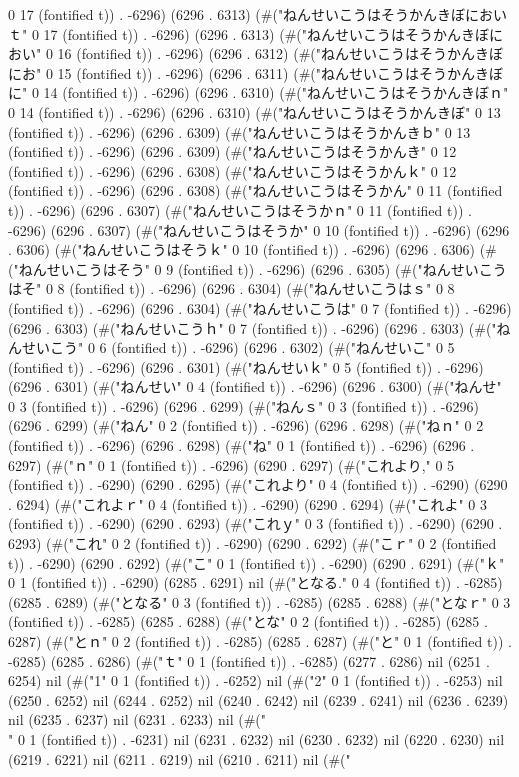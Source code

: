 0 17 (fontified t)) . -6296) (6296 . 6313) (#("ねんせいこうはそうかんきぼにおいｔ" 0 17 (fontified t)) . -6296) (6296 . 6313) (#("ねんせいこうはそうかんきぼにおい" 0 16 (fontified t)) . -6296) (6296 . 6312) (#("ねんせいこうはそうかんきぼにお" 0 15 (fontified t)) . -6296) (6296 . 6311) (#("ねんせいこうはそうかんきぼに" 0 14 (fontified t)) . -6296) (6296 . 6310) (#("ねんせいこうはそうかんきぼｎ" 0 14 (fontified t)) . -6296) (6296 . 6310) (#("ねんせいこうはそうかんきぼ" 0 13 (fontified t)) . -6296) (6296 . 6309) (#("ねんせいこうはそうかんきｂ" 0 13 (fontified t)) . -6296) (6296 . 6309) (#("ねんせいこうはそうかんき" 0 12 (fontified t)) . -6296) (6296 . 6308) (#("ねんせいこうはそうかんｋ" 0 12 (fontified t)) . -6296) (6296 . 6308) (#("ねんせいこうはそうかん" 0 11 (fontified t)) . -6296) (6296 . 6307) (#("ねんせいこうはそうかｎ" 0 11 (fontified t)) . -6296) (6296 . 6307) (#("ねんせいこうはそうか" 0 10 (fontified t)) . -6296) (6296 . 6306) (#("ねんせいこうはそうｋ" 0 10 (fontified t)) . -6296) (6296 . 6306) (#("ねんせいこうはそう" 0 9 (fontified t)) . -6296) (6296 . 6305) (#("ねんせいこうはそ" 0 8 (fontified t)) . -6296) (6296 . 6304) (#("ねんせいこうはｓ" 0 8 (fontified t)) . -6296) (6296 . 6304) (#("ねんせいこうは" 0 7 (fontified t)) . -6296) (6296 . 6303) (#("ねんせいこうｈ" 0 7 (fontified t)) . -6296) (6296 . 6303) (#("ねんせいこう" 0 6 (fontified t)) . -6296) (6296 . 6302) (#("ねんせいこ" 0 5 (fontified t)) . -6296) (6296 . 6301) (#("ねんせいｋ" 0 5 (fontified t)) . -6296) (6296 . 6301) (#("ねんせい" 0 4 (fontified t)) . -6296) (6296 . 6300) (#("ねんせ" 0 3 (fontified t)) . -6296) (6296 . 6299) (#("ねんｓ" 0 3 (fontified t)) . -6296) (6296 . 6299) (#("ねん" 0 2 (fontified t)) . -6296) (6296 . 6298) (#("ねｎ" 0 2 (fontified t)) . -6296) (6296 . 6298) (#("ね" 0 1 (fontified t)) . -6296) (6296 . 6297) (#("ｎ" 0 1 (fontified t)) . -6296) (6290 . 6297) (#("これより," 0 5 (fontified t)) . -6290) (6290 . 6295) (#("これより" 0 4 (fontified t)) . -6290) (6290 . 6294) (#("これよｒ" 0 4 (fontified t)) . -6290) (6290 . 6294) (#("これよ" 0 3 (fontified t)) . -6290) (6290 . 6293) (#("これｙ" 0 3 (fontified t)) . -6290) (6290 . 6293) (#("これ" 0 2 (fontified t)) . -6290) (6290 . 6292) (#("こｒ" 0 2 (fontified t)) . -6290) (6290 . 6292) (#("こ" 0 1 (fontified t)) . -6290) (6290 . 6291) (#("ｋ" 0 1 (fontified t)) . -6290) (6285 . 6291) nil (#("となる." 0 4 (fontified t)) . -6285) (6285 . 6289) (#("となる" 0 3 (fontified t)) . -6285) (6285 . 6288) (#("となｒ" 0 3 (fontified t)) . -6285) (6285 . 6288) (#("とな" 0 2 (fontified t)) . -6285) (6285 . 6287) (#("とｎ" 0 2 (fontified t)) . -6285) (6285 . 6287) (#("と" 0 1 (fontified t)) . -6285) (6285 . 6286) (#("ｔ" 0 1 (fontified t)) . -6285) (6277 . 6286) nil (6251 . 6254) nil (#("1" 0 1 (fontified t)) . -6252) nil (#("2" 0 1 (fontified t)) . -6253) nil (6250 . 6252) nil (6244 . 6252) nil (6240 . 6242) nil (6239 . 6241) nil (6236 . 6239) nil (6235 . 6237) nil (6231 . 6233) nil (#("\\" 0 1 (fontified t)) . -6231) nil (6231 . 6232) nil (6230 . 6232) nil (6220 . 6230) nil (6219 . 6221) nil (6211 . 6219) nil (6210 . 6211) nil (#("
